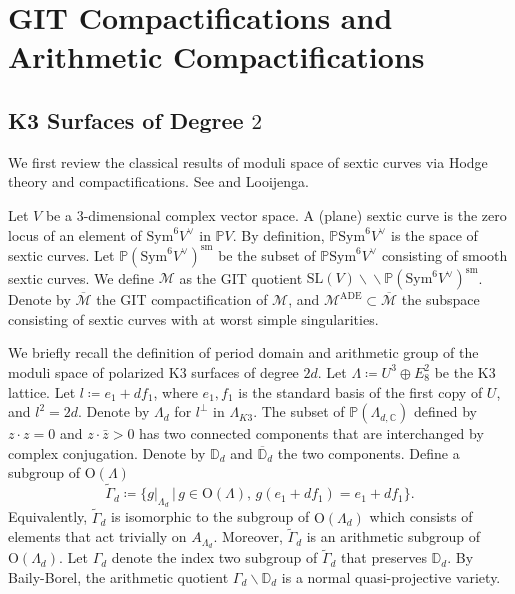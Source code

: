 \documentclass[
]{article}
\begin{document}
\section{GIT Compactifications and Arithmetic
Compactifications}\label{section:ux20compactification}

\subsection{\texorpdfstring{K3 Surfaces of Degree
\(2\)}{K3 Surfaces of Degree 2}}\label{subsection:ux20Shahux2cux20Looijenga}

We first review the classical results of moduli space of sextic curves
via Hodge theory and compactifications. See \cite{shah1980complete} and
Looijenga.

Let \(V\) be a \(3\)-dimensional complex vector space. A (plane) sextic
curve is the zero locus of an element of \(\mathrm{Sym}^6 V^\vee\) in
\(\mathbb{P} V\). By definition, \(\mathbb{P}\mathrm{Sym}^6 V^\vee\) is
the space of sextic curves. Let
\(\mathbb{P}(\mathrm{Sym}^6 V^\vee)^{\mathrm{sm}}\) be the subset of
\(\mathbb{P}\mathrm{Sym}^6 V^\vee\) consisting of smooth sextic curves.
We define \(\mathcal{M}\) as the GIT quotient
\(\mathrm{SL}(V)\backslash\!\! \backslash\mathbb{P}(\mathrm{Sym}^6 V^\vee)^{\mathrm{sm}}\).
Denote by \(\overline{\mathcal{M}}\) the GIT compactification of
\(\mathcal{M}\), and
\(\mathcal{M}^{\mathrm{ADE}}\subset \overline{\mathcal{M}}\) the
subspace consisting of sextic curves with at worst simple singularities.

We briefly recall the definition of period domain and arithmetic group
of the moduli space of polarized K3 surfaces of degree \(2d\). Let
\(\Lambda\coloneqq U^3\oplus E_8^2\) be the K3 lattice. Let
\(l\coloneqq e_1+df_1\), where \(e_1,f_1\) is the standard basis of the
first copy of \(U\), and \(l^2=2d\). Denote by \(\Lambda_d\) for
\(l^{\perp}\) in \(\Lambda_{K3}\). The subset of
\(\mathbb{P}(\Lambda_{d,\mathbb{C}})\) defined by \(z\cdot z=0\) and
\(z\cdot\bar{z}>0\) has two connected components that are interchanged
by complex conjugation. Denote by \(\mathbb{D}_d\) and
\(\overline{\mathbb{D}}_d\) the two components. Define a subgroup of
\(\mathrm{O}(\Lambda)\)
\[\widetilde\Gamma_d\coloneqq \{ g|_{\Lambda_d} \,\big|\, g\in \mathrm{O}(\Lambda),\, g(e_1+df_1)=e_1+df_1 \}.\]
Equivalently, \(\widetilde\Gamma_d\) is isomorphic to the subgroup of
\(\mathrm{O}(\Lambda_d)\) which consists of elements that act trivially
on \(A_{\Lambda_d}\). Moreover, \(\widetilde\Gamma_d\) is an arithmetic
subgroup of \(\mathrm{O}(\Lambda_d)\). Let \(\Gamma_d\) denote the index
two subgroup of \(\widetilde\Gamma_d\) that preserves \(\mathbb{D}_d\).
By Baily-Borel, the arithmetic quotient
\(\Gamma_d\backslash\mathbb{D}_d\) is a normal quasi-projective variety.
\end{document}
